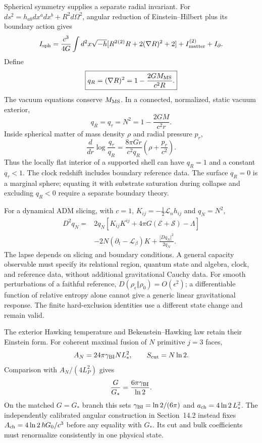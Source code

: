 \documentclass[11pt]{article}
\begin{document}
Spherical symmetry supplies a separate radial invariant.
For \(ds^2=h_{ab}dx^adx^b+R^2d\Omega^2\), angular reduction
of Einstein--Hilbert plus its boundary action gives
\[
I_{\rm sph}=\frac{c^3}{4G}\int d^2x\sqrt{-h}
[R^2{}^{(2)}R+2(\nabla R)^2+2]+I_{\rm matter}^{(2)}+I_\partial .
\]
Define
\[
\boxed{q_R=(\nabla R)^2=1-\frac{2GM_{\rm MS}}{c^2R}.}
\]
The vacuum equations conserve \(M_{\rm MS}\).
In a connected, normalized, static vacuum exterior,
\[
q_R=q_\tau=N^2=1-\frac{2GM}{c^2r}.
\]
Inside spherical matter of mass density \(\rho\) and radial
pressure \(p_r\),
\[
\frac{d}{dr}\log\frac{q_\tau}{q_R}
=\frac{8\pi Gr}{c^2q_R}
\left(\rho+\frac{p_r}{c^2}\right).
\]
Thus the locally flat interior of a supported shell can have
\(q_R=1\) and a constant \(q_\tau<1\).
The clock redshift includes boundary reference data.
The surface \(q_R=0\) is a marginal sphere; equating it with
substrate saturation during collapse and excluding \(q_R<0\)
require a separate boundary theory.

For a dynamical ADM slicing, with \(c=1\),
\(K_{ij}=-\tfrac12\mathcal L_nh_{ij}\) and \(q_N=N^2\),
\[
\begin{split}
D^2q_N={}&2q_N[K_{ij}K^{ij}+4\pi G(\mathcal E+\mathcal S)-\Lambda]\\
&-2N(\partial_t-\mathcal L_\beta)K+\frac{|Dq_N|^2}{2q_N}.
\end{split}
\]
The lapse depends on slicing and boundary conditions.
A general capacity observable must specify its relational
region, quantum state and algebra, clock, and reference data,
without additional gravitational Cauchy data.
For smooth perturbations of a faithful reference,
\(D(\rho_\epsilon\Vert\rho_0)=O(\epsilon^2)\);
a differentiable function of relative entropy alone cannot
give a generic linear gravitational response.
The finite hard-exclusion identities use a different state
change and remain valid.

The exterior Hawking temperature and Bekenstein--Hawking law
retain their Einstein form. For coherent maximal fusion of
\(N\) primitive \(j=3\) faces,
\[
A_N=24\pi\gamma_{\rm BI}NL_*^2,\qquad
S_{\rm cut}=N\ln2.
\]
Comparison with \(A_N/(4L_P^2)\) gives
\[
\frac{G}{G_*}=\frac{6\pi\gamma_{\rm BI}}{\ln2}.
\]
On the matched \(G=G_*\) branch this sets
\(\gamma_{\rm BI}=\ln2/(6\pi)\) and
\(a_{\rm ch}=4\ln2\,L_*^2\).
The independently calibrated angular construction in
Section~14.2 instead fixes
\(A_{\rm ch}=4\ln2\,\hbar G_0/c^3\) before any equality
with \(G_*\). Its cut and bulk coefficients must renormalize
consistently in one physical state.
\end{document}
